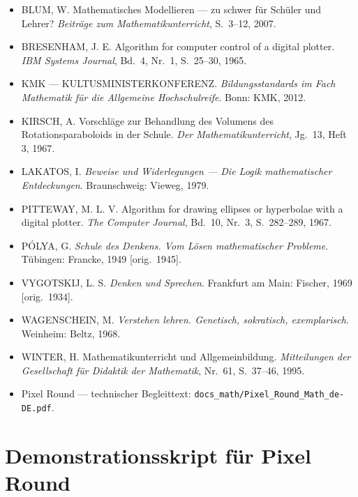 \documentclass[12pt,a4paper]{scrartcl}
\begin{document}
\begin{itemize}[leftmargin=1.3em,itemsep=0.2em,topsep=0.3em]
  \item BLUM, W. Mathematisches Modellieren --- zu schwer für Schüler und Lehrer? \emph{Beiträge zum Mathematikunterricht}, S.~3--12, 2007.
  \item BRESENHAM, J. E. Algorithm for computer control of a digital plotter. \emph{IBM Systems Journal}, Bd.~4, Nr.~1, S.~25--30, 1965.
  \item KMK --- KULTUSMINISTERKONFERENZ. \emph{Bildungsstandards im Fach Mathematik für die Allgemeine Hochschulreife}. Bonn: KMK, 2012.
  \item KIRSCH, A. Vorschläge zur Behandlung des Volumens des Rotationsparaboloids in der Schule. \emph{Der Mathematikunterricht}, Jg.~13, Heft 3, 1967.
  \item LAKATOS, I. \emph{Beweise und Widerlegungen --- Die Logik mathematischer Entdeckungen}. Braunschweig: Vieweg, 1979.
  \item PITTEWAY, M. L. V. Algorithm for drawing ellipses or hyperbolae with a digital plotter. \emph{The Computer Journal}, Bd.~10, Nr.~3, S.~282--289, 1967.
  \item PÓLYA, G. \emph{Schule des Denkens. Vom Lösen mathematischer Probleme}. Tübingen: Francke, 1949 [orig.~1945].
  \item VYGOTSKIJ, L. S. \emph{Denken und Sprechen}. Frankfurt am Main: Fischer, 1969 [orig.~1934].
  \item WAGENSCHEIN, M. \emph{Verstehen lehren. Genetisch, sokratisch, exemplarisch}. Weinheim: Beltz, 1968.
  \item WINTER, H. Mathematikunterricht und Allgemeinbildung. \emph{Mitteilungen der Gesellschaft für Didaktik der Mathematik}, Nr.~61, S.~37--46, 1995.
  \item Pixel Round --- technischer Begleittext: \texttt{docs\_math/Pixel\_Round\_Math\_de-DE.pdf}.
\end{itemize}

\newpage
\appendix
\renewcommand{\thesection}{\Alph{section}}
\setcounter{section}{0}

\section{Demonstrationsskript für Pixel Round}\label{ap:skript}
\end{document}
